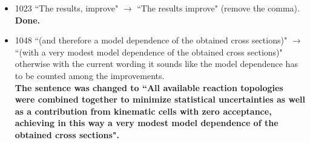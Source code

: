 \documentclass[,superscriptaddress,showpacs,amssymb,amsmath,amsfonts,linenumbers,article]{revtex4-1}
\begin{document}
\begin{itemize}
\item  1023 ``The results, improve"  $\rightarrow$ ``The results improve" (remove the comma).\\
{\bf Done.}

\item 1048 ``(and therefore a model dependence of the obtained cross sections)"  $\rightarrow$ ``(with a very modest
model dependence of the obtained cross sections)" otherwise with the current wording it sounds
like the model dependence has to be counted among the improvements.\\
{\bf The sentence was changed to ``All available reaction topologies were combined together to minimize statistical uncertainties as well as a contribution from kinematic cells with zero acceptance, achieving in this way a very modest model dependence of the obtained cross sections".}

\end{itemize}
\end{document}
